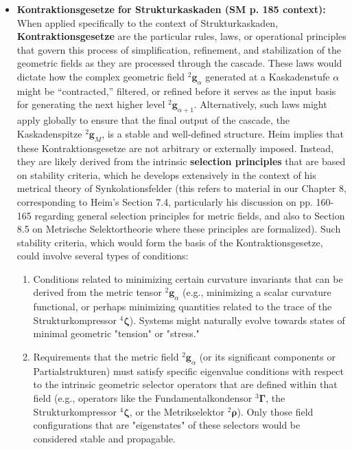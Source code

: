 \documentclass[12pt]{article}
\newcommand{\q}[1]{\enquote{#1}}
\newcommand{\kompositionsfeld}{{}^2\mathbf{g}}
\newcommand{\fundamentalkondensor}{{}^3\bm{\Gamma}}
\newcommand{\kaskadenstufe}{\alpha}
\newcommand{\strukturkompressor}{{}^4\bm{\zeta}}
\begin{document}
\begin{itemize}
    \item \textbf{Kontraktionsgesetze for Strukturkaskaden (SM p. 185 context):}
    When applied specifically to the context of Strukturkaskaden, \textbf{Kontraktionsgesetze} are the particular rules, laws, or operational principles that govern this process of simplification, refinement, and stabilization of the geometric fields as they are processed through the cascade. These laws would dictate how the complex geometric field \( \kompositionsfeld_\alpha \) generated at a Kaskadenstufe \( \kaskadenstufe \) might be \q{contracted,} filtered, or refined before it serves as the input basis for generating the next higher level \( \kompositionsfeld_{\alpha+1} \). Alternatively, such laws might apply globally to ensure that the final output of the cascade, the Kaskadenspitze \( \kompositionsfeld_M \), is a stable and well-defined structure.
    Heim implies that these Kontraktionsgesetze are not arbitrary or externally imposed. Instead, they are likely derived from the intrinsic \textbf{selection principles} that are based on stability criteria, which he develops extensively in the context of his metrical theory of Synkolationsfelder (this refers to material in our Chapter 8, corresponding to Heim's Section 7.4, particularly his discussion on pp. 160-165 regarding general selection principles for metric fields, and also to Section 8.5 on Metrische Selektortheorie where these principles are formalized). Such stability criteria, which would form the basis of the Kontraktionsgesetze, could involve several types of conditions:
    \begin{enumerate}
        \item Conditions related to minimizing certain curvature invariants that can be derived from the metric tensor \( \kompositionsfeld_\alpha \) (e.g., minimizing a scalar curvature functional, or perhaps minimizing quantities related to the trace of the Strukturkompressor \( \strukturkompressor \)). Systems might naturally evolve towards states of minimal geometric "tension" or "stress."
        \item Requirements that the metric field \( \kompositionsfeld_\alpha \) (or its significant components or Partialstrukturen) must satisfy specific eigenvalue conditions with respect to the intrinsic geometric selector operators that are defined within that field (e.g., operators like the Fundamentalkondensor \( \fundamentalkondensor \), the Strukturkompressor \( \strukturkompressor \), or the Metrikselektor \( {}^2\bm{\rho} \)). Only those field configurations that are "eigenstates" of these selectors would be considered stable and propagable.

\end{enumerate}
\end{itemize}
\end{document}

